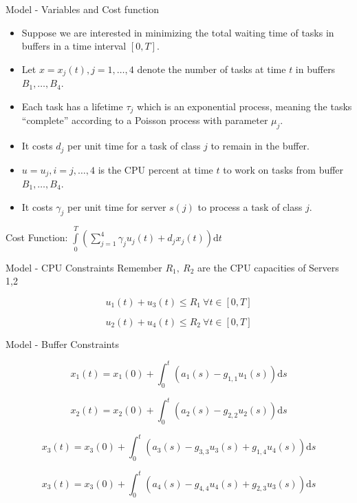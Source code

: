 \documentclass[pdf]{beamer}
\theoremstyle{definition}
\begin{document}
\begin{frame}{Model - Variables and Cost function}
        \begin{itemize}
            \item Suppose we are interested in minimizing the total waiting time
            of tasks in buffers in a time interval $[0,T]$.
            \item Let $x = x_j(t), j=1,\ldots, 4$ denote the number of tasks at time $t$ in buffers $B_1, \ldots, B_4$.
            \item Each task has a lifetime $\tau_j$ which is an exponential process,
            meaning the tasks ``complete'' according to a Poisson process with parameter $\mu_j$.
            \item It costs $d_j$ per unit time for a task of class $j$ to remain in the buffer.
            \item $u = u_j, i=j,\ldots,4$ is the CPU percent at time $t$ to work on tasks from buffer $B_1, \ldots, B_4$.
            \item It costs $\gamma_j$ per unit time for server $s(j)$ to process a task of class $j$.
        \end{itemize}

        Cost Function:
        $
        \int\limits_0^T \left(\sum\limits_{j=1}^4 \gamma_j u_j(t) + d_j x_j(t) \right) \textrm{d}t
        $

\end{frame}


\begin{frame}{Model - CPU Constraints}
        Remember $R_1,~R_2$ are the CPU capacities of Servers 1,2

        $$
        u_1(t) + u_3(t) \leq R_1 ~ \forall t \in [0,T]
        $$

        $$
        u_2(t) + u_4(t) \leq R_2 ~ \forall t \in [0,T]
        $$



\end{frame}


\begin{frame}{Model - Buffer Constraints}


$$
x_1(t) = x_1(0) + \int_0^t \left( a_1(s) - g_{1,1} u_1(s) \right) \textrm{d}s
$$

$$
x_2(t) = x_2(0) + \int_0^t \left( a_2(s) - g_{2,2} u_2(s) \right) \textrm{d}s
$$

$$
x_3(t) = x_3(0) + \int_0^t \left( a_3(s) - g_{3,3} u_3(s) + g_{1,4} u_4(s) \right) \textrm{d}s
$$

$$
x_3(t) = x_3(0) + \int_0^t \left( a_4(s) - g_{4,4} u_4(s)  + g_{2,3} u_3(s)\right) \textrm{d}s
$$

\end{frame}
\end{document}
